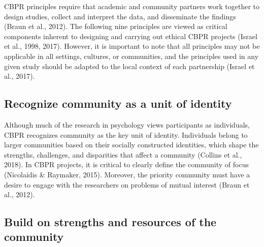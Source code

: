 \documentclass[
  11pt,
]{book}
\begin{document}
CBPR principles require that academic and community partners work together to design studies, collect and interpret the data, and disseminate the findings (Braun et al., 2012). The following nine principles are viewed as critical components inherent to designing and carrying out ethical CBPR projects (Israel et al., 1998, 2017). However, it is important to note that all principles may not be applicable in all settings, cultures, or communities, and the principles used in any given study should be adapted to the local context of each partnership (Israel et al., 2017).

\hypertarget{recognize-community-as-a-unit-of-identity}{%
\subsection{Recognize community as a unit of identity}\label{recognize-community-as-a-unit-of-identity}}

Although much of the research in psychology views participants as individuals, CBPR recognizes community as the key unit of identity. Individuals belong to larger communities based on their socially constructed identities, which shape the strengths, challenges, and disparities that affect a community (Collins et al., 2018). In CBPR projects, it is critical to clearly define the community of focus (Nicolaidis \& Raymaker, 2015). Moreover, the priority community must have a desire to engage with the researchers on problems of mutual interest (Braun et al., 2012).

\hypertarget{build-on-strengths-and-resources-of-the-community}{%
\subsection{Build on strengths and resources of the community}\label{build-on-strengths-and-resources-of-the-community}}
\end{document}
